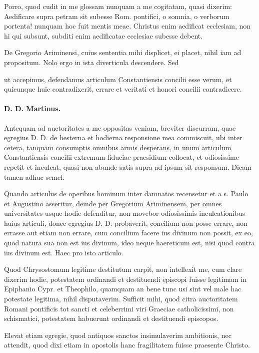 Porro, quod cudit in me glossam nunquam a me cogitatam, quasi dixerim: Aedificare supra petram sit subesse Rom. pontifici, o somnia, o verborum portenta! nunquam hoc fuit mentis meae. Christus enim aedificat ecclesiam, non hi qui subsunt, subditi enim aedificatae ecclesiae subesse debent.

De Gregorio Ariminensi, cuius sententia mihi displicet, ei placet, nihil iam ad propositum. Nolo ergo in ista diverticula descendere. Sed

ut accepimus, defendamus articulum Constantiensis concilii esse verum, et quicunque huic contradixerit, errare et veritati et honori concilii contradicere.

\paragraph*{D. D. Martinus.}

Antequam ad auctoritates a me oppositas veniam, breviter discurram, quae egregius D. D. de hesterna et hodierna responsione mea commiscuit, ubi inter cetera, tanquam consumptis omnibus armis desperans, in unum articulum Constantiensis concilii extremum fiduciae praesidium collocat, et odiosissime repetit et inculcat, quasi non abunde satis supra ad ipsum sit responsum. Dicam tamen adhuc semel.

Quando articulus de operibus hominum inter damnatos recensetur et a s. Paulo et Augustino asseritur, deinde per Gregorium Ariminensem, per omnes universitates usque hodie defenditur, non movebor odiosissimis inculcationibus huius articuli, donec egregius D. D. probaverit, concilium non posse errare, non errasse aut etiam non errare, cum concilium facere ius divinum non possit, ex eo, quod natura sua non est ius divinum, ideo neque haereticum est, nisi quod contra ius divinum est. Haec pro isto articulo.

Quod Chrysostomum legitime destitutum carpit, non intellexit me, cum clare dixerim hodie, potestatem ordinandi et destituendi episcopi fuisse legitimam in Epiphanio Cypr. et Theophilo, quamquam an bene tunc usi sint vel male hac potestate legitima, nihil disputaverim. Sufficit mihi, quod citra \marginpar{\small[309]} auctoritatem Romani pontificis tot sancti et celeberrimi viri Graeciae catholicissimi, non schismatici, potestatem habuerunt ordinandi et destituendi episcopos.

Elevat etiam egregie, quod antiquos sanctos insimulaverim ambitionis, nec attendit, quod dixi etiam in apostolis hanc fragilitatem fuisse praesente Christo.

